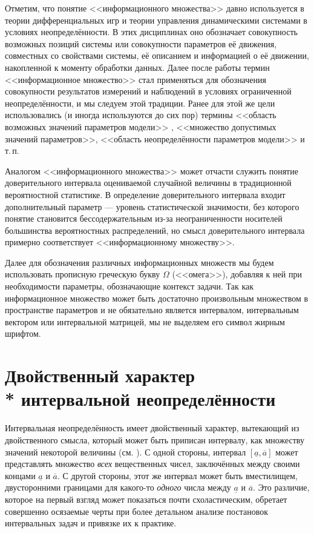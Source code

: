 \documentclass[a5paper,openany]{book}
\newcommand{\ov}{\overline}
\newcommand{\un}{\underline}
\begin{document}
Отметим, что понятие <<информационного множества>> давно используется в теории 
дифференциальных игр и теории управления динамическими системами в условиях 
неопределённости. В этих дисциплинах оно обозначает совокупность возможных позиций 
системы или совокупности параметров её движения, совместных со свойствами системы, 
её описанием и информацией о её движении, накопленной к моменту обработки данных. 
Далее после работы \cite{Kurzhanski} термин <<информационное множество>> стал 
применяться для обозначения совокупности результатов измерений и наблюдений 
в условиях ограниченной  неопределённости, и мы следуем этой традиции. Ранее 
для этой же цели использовались (и иногда используются до сих пор) термины 
<<область возможных значений параметров модели>> \cite{VoschininSotirov}, 
<<множество допустимых значений параметров>>, <<область неопределённости параметров 
модели>> \cite{KantorSpivak,SpivakEtAl} и т.\,п. 
  
Аналогом <<информационного множества>> может отчасти служить понятие доверительного 
интервала  оцениваемой случайной величины в традиционной вероятностной статистике. 
В определение доверительного интервала входит дополнительный параметр --- уровень 
статистической значимости, без которого понятие становится бессодержательным из-за 
неограниченности носителей большинства вероятностных распределений, но смысл 
доверительного интервала примерно соответствует <<информационному множеству>>. 
  
Далее для обозначения различных информационных множеств мы будем использовать прописную 
греческую букву $\varOmega$ (<<омега>>), добавляя к ней при необходимости параметры, 
обозначающие контекст задачи. Так как информационное множество может быть достаточно 
произвольным множеством в пространстве параметров и не обязательно является интервалом, 
интервальным вектором или интервальной матрицей, мы не выделяем  его символ жирным 
шрифтом. 
  
  
\section[Двойственный характер интервальной неопределённости]%
        {Двойственный характер \\* интервальной неопределённости} 
\label{DualUncertSect}
  
Интервальная неопределённость имеет двойственный характер, вытекающий из двойственного 
смысла, который может быть приписан интервалу, как множеству значений некоторой 
величины (см. \cite{SSharyIzvAN97, SSharyBook, SSharySurvey2002}). С одной стороны, 
интервал $[\un{a}, \ov{a}]$ может представлять множество \emph{всех} вещественных чисел, 
заключённых между своими концами $\un{a}$ и $\ov{a}$. С другой стороны, этот же 
интервал может быть вместилищем, двусторонними границами для какого-то \emph{одного} 
числа между $\un{a}$ и $\ov{a}$. Это различие, которое на первый взгляд может показаться 
почти схоластическим, обретает совершенно осязаемые черты при более детальном анализе 
постановок интервальных задач и привязке их к практике. 
  
\end{document}
